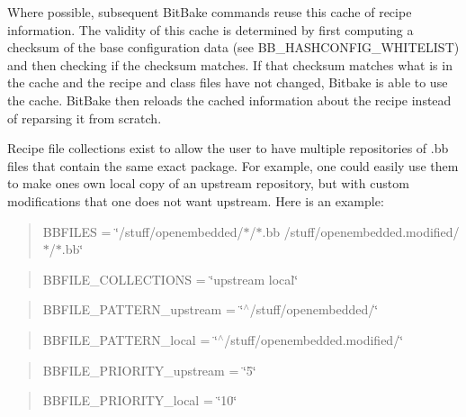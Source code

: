 Where possible, subsequent Bit\+Bake commands reuse this cache of recipe information. The validity of this cache is determined by first computing a checksum of the base configuration data (see B\+B\+\_\+\+H\+A\+S\+H\+C\+O\+N\+F\+I\+G\+\_\+\+W\+H\+I\+T\+E\+L\+I\+ST) and then checking if the checksum matches. If that checksum matches what is in the cache and the recipe and class files have not changed, Bitbake is able to use the cache. Bit\+Bake then reloads the cached information about the recipe instead of reparsing it from scratch.

Recipe file collections exist to allow the user to have multiple repositories of .bb files that contain the same exact package. For example, one could easily use them to make one\textquotesingle{}s own local copy of an upstream repository, but with custom modifications that one does not want upstream. Here is an example\+:

\begin{quote}
B\+B\+F\+I\+L\+ES = \char`\"{}/stuff/openembedded/$\ast$/$\ast$.\+bb /stuff/openembedded.\+modified/$\ast$/$\ast$.\+bb\char`\"{} \end{quote}


\begin{quote}
B\+B\+F\+I\+L\+E\+\_\+\+C\+O\+L\+L\+E\+C\+T\+I\+O\+NS = \char`\"{}upstream local\char`\"{} \end{quote}


\begin{quote}
B\+B\+F\+I\+L\+E\+\_\+\+P\+A\+T\+T\+E\+R\+N\+\_\+upstream = \char`\"{}$^\wedge$/stuff/openembedded/\char`\"{} \end{quote}


\begin{quote}
B\+B\+F\+I\+L\+E\+\_\+\+P\+A\+T\+T\+E\+R\+N\+\_\+local = \char`\"{}$^\wedge$/stuff/openembedded.\+modified/\char`\"{} \end{quote}


\begin{quote}
B\+B\+F\+I\+L\+E\+\_\+\+P\+R\+I\+O\+R\+I\+T\+Y\+\_\+upstream = \char`\"{}5\char`\"{} \end{quote}


\begin{quote}
B\+B\+F\+I\+L\+E\+\_\+\+P\+R\+I\+O\+R\+I\+T\+Y\+\_\+local = \char`\"{}10\char`\"{} \end{quote}



